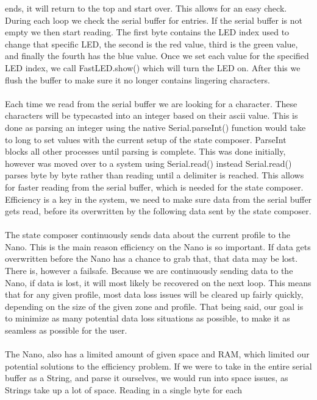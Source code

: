 \documentclass[onecolumn, draftclsnofoot,10pt, compsoc]{IEEEtran}
\begin{document}
	ends, it will return to the top and start over.  This allows for an easy check.
	During each loop we check the serial buffer for entries. If the serial buffer
	is not empty we then start reading. The first byte contains the LED index used
	to change that specific LED, the second is the red value, third is the green
	value, and finally the fourth has the blue value.  Once we set each value for
	the specified LED index, we call FastLED.show() which will turn the LED on.
	After this we flush the buffer to make sure it no longer contains lingering characters.
 	\\\\
	\noindent Each time we read from the serial buffer we are looking for a character. These
	characters will be typecasted into an integer based on their ascii value.
	This is done as parsing an integer using the native Serial.parseInt() function
	would take to long to set values with the current setup of the state composer.
	ParseInt blocks all other processes until parsing is complete. This was done
	initially, however was moved over to a system using Serial.read() instead
	Serial.read() parses byte by byte rather than reading until a delimiter is
	reached. This allows for faster reading from the serial buffer, which is
	needed for the state composer. Efficiency is a key in the system, we need to
	make sure data from the serial buffer gets read, before its overwritten by the
	following data sent by the state composer.
	\\\\
	\noindent The state composer continuously sends data about the current profile to the
	Nano. This is the main reason efficiency on the Nano is so important. If data
	gets overwritten before the Nano has a chance to grab that, that data may be
	lost. There is, however a failsafe. Because we are continuously sending data
	to the Nano, if data is lost, it will most likely be recovered on the next
	loop. This means that for any given profile, most data loss issues will be
	cleared up fairly quickly, depending on the size of the given zone and profile.
	That being said, our goal is to minimize as many potential data loss situations
	as possible, to make it as seamless as possible for the user.
	\\\\
	\noindent The Nano, also has a limited amount of given space and RAM, which limited our
	potential solutions to the efficiency problem. If we were to take in the entire
	serial buffer as a String, and parse it ourselves, we would run into space
	issues, as Strings take up a lot of space. Reading in a single byte for each
\end{document}
